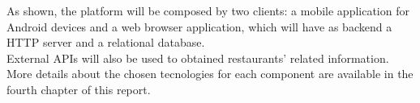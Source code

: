 As shown, the platform will be composed by two clients: a mobile application for Android devices and a web browser
application, which will have as backend a HTTP server and a relational database.\\

External APIs will also be used to obtained restaurants' related information.\\

More details about the chosen tecnologies for each component are available in the fourth chapter of this report.\\